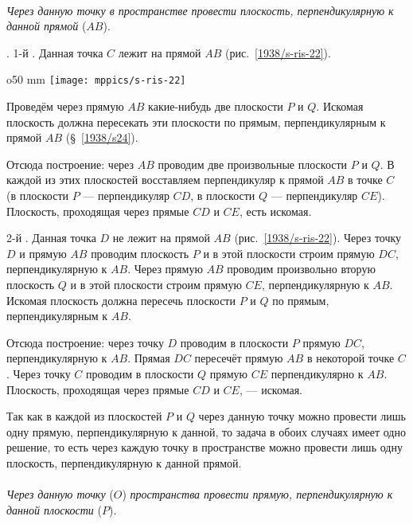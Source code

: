 \paragraph{}\label{1938/s35}
\emph{Через данную точку в пространстве провести плоскость, перпендикулярную к данной прямой} ($AB$).

\medskip

.
1-й .
Данная точка $C$ лежит на прямой $AB$ (рис.~\ref{1938/s-ris-22}).

\begin{wrapfigure}{o}{50 mm}
\centering
\texttt{[image: mppics/s-ris-22]}
\caption{}\label{1938/s-ris-22}
\end{wrapfigure}

Проведём через прямую $AB$ какие-нибудь две плоскости $P$ и $Q$.
Искомая плоскость должна пересекать эти плоскости по прямым, перпендикулярным к прямой $AB$ (§~\ref{1938/s24}).

Отсюда построение: через $AB$ проводим две произвольные плоскости $P$ и $Q$.
В каждой из этих плоскостей восставляем перпендикуляр к прямой $AB$ в точке $C$ (в плоскости $P$ — перпендикуляр $CD$, в плоскости $Q$ — перпендикуляр $CE$).
Плоскость, проходящая через прямые $CD$ и $CE$, есть искомая.

2-й .
Данная точка $D$ не лежит на прямой $AB$ (рис.~\ref{1938/s-ris-22}).
Через точку $D$ и прямую $AB$ проводим плоскость $P$ и в этой плоскости строим прямую $DC$, перпендикулярную к $AB$.
Через прямую $AB$ проводим произвольно вторую плоскость $Q$ и в этой плоскости строим прямую $CE$, перпендикулярную к $AB$.
Искомая плоскость должна пересечь плоскости $P$ и $Q$ по прямым, перпендикулярным к $AB$.

Отсюда построение: через точку $D$ проводим в плоскости $P$ прямую $DC$, перпендикулярную к $AB$.
Прямая $DC$ пересечёт прямую $AB$ в некоторой точке $C$.
Через точку $C$ проводим в плоскости $Q$ прямую $CE$ перпендикулярно к $AB$.
Плоскость, проходящая через прямые $CD$ и $CE$, — искомая.

Так как в каждой из плоскостей $P$ и $Q$ через данную точку можно провести лишь одну прямую, перпендикулярную к данной, то задача в обоих случаях имеет одно решение, то есть через каждую точку в пространстве можно провести лишь одну плоскость, перпендикулярную к данной прямой.

\paragraph{}\label{1938/s36}
\emph{Через данную точку} ($O$) \emph{пространства провести прямую, перпендикулярную к данной плоскости} ($P$).

